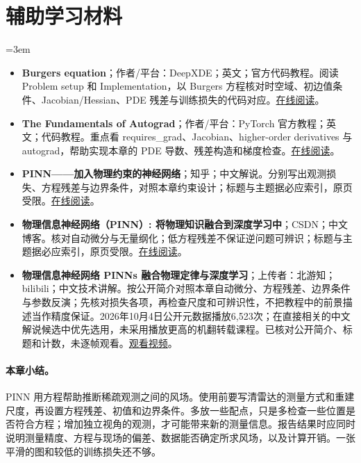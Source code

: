 \section*{辅助学习材料}
\begingroup
\emergencystretch=3em
\begin{itemize}
\item \textbf{Burgers equation}；作者/平台：DeepXDE；英文；官方代码教程。阅读 Problem setup 和 Implementation，以 Burgers 方程核对时空域、初边值条件、Jacobian/Hessian、PDE 残差与训练损失的代码对应。\href{https://deepxde.readthedocs.io/en/latest/demos/pinn\_forward/burgers.html}{在线阅读}。
\item \textbf{The Fundamentals of Autograd}；作者/平台：PyTorch 官方教程；英文；代码教程。重点看 requires\_grad、Jacobian、higher-order derivatives 与 autograd，帮助实现本章的 PDE 导数、残差构造和梯度检查。\href{https://docs.pytorch.org/tutorials/beginner/introyt/autogradyt\_tutorial.html}{在线阅读}。
\item \textbf{PINN——加入物理约束的神经网络}；知乎；中文解说。分别写出观测损失、方程残差与边界条件，对照本章约束设计；标题与主题据必应索引，原页受限。\href{https://zhuanlan.zhihu.com/p/544561165}{在线阅读}。
\item \textbf{物理信息神经网络（PINN）: 将物理知识融合到深度学习中}；CSDN；中文博客。核对自动微分与无量纲化；低方程残差不保证逆问题可辨识；标题与主题据必应索引，原页受限。\href{https://blog.csdn.net/qq\_28247201/article/details/136072595}{在线阅读}。
\item \textbf{物理信息神经网络 PINNs 融合物理定律与深度学习}；上传者：北游知；bilibili；中文技术讲解。按公开简介对照本章自动微分、方程残差、边界条件与参数反演；先核对损失各项，再检查尺度和可辨识性，不把教程中的前景描述当作精度保证。2026年10月4日公开元数据播放6,523次；在直接相关的中文解说候选中优先选用，未采用播放更高的机翻转载课程。已核对公开简介、标题和计数，未逐帧观看。\href{https://www.bilibili.com/video/BV1WfQsB6EKn/}{观看视频}。
\end{itemize}
\endgroup
\paragraph{本章小结。}
PINN 用方程帮助推断稀疏观测之间的风场。使用前要写清雷达的测量方式和重建尺度，再设置方程残差、初值和边界条件。多放一些配点，只是多检查一些位置是否符合方程；增加独立视角的观测，才可能带来新的测量信息。报告结果时应同时说明测量精度、方程与现场的偏差、数据能否确定所求风场，以及计算开销。一张平滑的图和较低的训练损失还不够。

